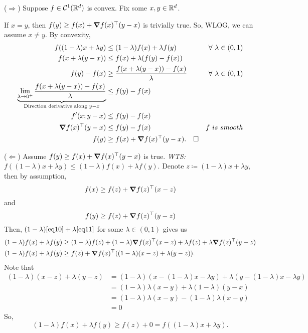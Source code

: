 \begin{prf}
	($\Rightarrow$)	Suppose $f\in{\mathcal{C}}^1({\mathbb{R}}^d)$ is convex. Fix some $x,y\in{\mathbb{R}}^d$. \par If $x=y$, then $f(y)\geq f(x)+\grad f(x)^\top(y-x)$ is trivially true. So, WLOG, we can assume $x\neq y$. By convexity, \begin{align*}f((1-\lambda)x+\lambda y)&\leq(1-\lambda)f(x)+\lambda f(y)&\forall\ \lambda\in(0,1)\\f(x+\lambda(y-x))&\leq f(x)+\lambda(f(y)-f(x))\\f(y)-f(x)&\geq\dfrac{f(x+\lambda(y-x))-f(x)}{\lambda}&\forall\ \lambda\in(0,1)\\\underbrace{\lim_{\lambda\to0^+}\dfrac{f(x+\lambda(y-x))-f(x)}{\lambda}}_{\text{Direction derivative along }y-x}&\leq f(y)-f(x)\\f'(x;y-x)&\leq f(y)-f(x)\\\grad f(x)^\top(y-x)&\leq f(y)-f(x)&f\ is\ smooth\\f(y)&\geq f(x)+\grad f(x)^\top(y-x).\pqde\end{align*}\par 
	($\Leftarrow$) Assume $f(y)\geq f(x)+\grad f(x)^\top(y-x)$ is true. \textit{WTS: $f((1-\lambda)x+\lambda y)\leq (1-\lambda)f(x)+\lambda f(y)$}. Denote $z\coloneqq(1-\lambda)x+\lambda y$, then by assumption, \begin{equation}\label{eq10}f(x)\geq f(z)+\grad f(z)^\top(x-z)\end{equation} and \begin{equation}\label{eq11}f(y)\geq f(z)+\grad f(z)^\top(y-z)\end{equation} Then, $(1-\lambda)\eqref{eq10}+\lambda\eqref{eq11}$ for some $\lambda\in(0,1)$ gives us \begin{align*}(1-\lambda)f(x)+\lambda f(y)&\geq(1-\lambda)f(z)+(1-\lambda)\grad f(x)^\top(x-z)+\lambda f(z)+\lambda\grad f(z)^\top(y-z)\\(1-\lambda)f(x)+\lambda f(y)&\geq f(z)+\grad f(x)^\top((1-\lambda)(x-z)+\lambda(y-z)).\end{align*} Note that \begin{align*}(1-\lambda)(x-z)+\lambda(y-z)&=(1-\lambda)(x-(1-\lambda)x-\lambda y)+\lambda(y-(1-\lambda)x-\lambda y)\\&=(1-\lambda)\lambda(x-y)+\lambda(1-\lambda)(y-x)\\&=(1-\lambda)\lambda(x-y)-(1-\lambda)\lambda(x-y)\\&=0\end{align*} So, \[(1-\lambda)f(x)+\lambda f(y)\geq f(z)+0=f((1-\lambda)x+\lambda y).\]
\end{prf}
